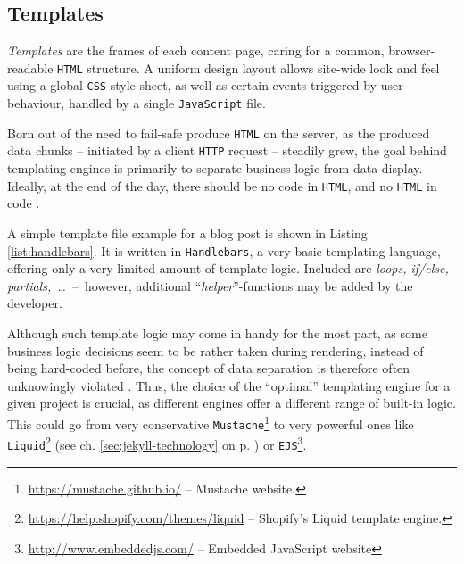 \subsection{Templates}
\label{sec:buildpipelines-templates}

\emph{Templates} are the frames of each content page, caring for a common, browser-readable \texttt{HTML} structure. A uniform design layout allows site-wide look and feel using a global \texttt{CSS} style sheet, as well as certain events triggered by user behaviour, handled by a single \texttt{JavaScript} file.

Born out of the need to fail-safe produce \texttt{HTML} on the server, as the produced data chunks -- initiated by a client \texttt{HTTP} request -- steadily grew, the goal behind templating engines is primarily to separate business logic from data display. Ideally, at the end of the day, there should be no code in \texttt{HTML}, and no \texttt{HTML} in code \cite[225]{Parr2004templates}.



A simple template file example for a blog post is shown in Listing \ref{list:handlebars}. It is written in \texttt{Handlebars}, a very basic templating language, offering only a very limited amount of template logic. Included are \emph{loops, if/else, partials,~\ldots}~--~however, additional ``\emph{helper}''-functions may be added by the developer.

Although such template logic may come in handy for the most part, as some business logic decisions seem to be rather taken during rendering, instead of being hard-coded before, the concept of data separation is therefore often unknowingly violated \cite[228]{Parr2004templates}. Thus, the choice of the ``optimal'' templating engine for a given project is crucial, as different engines offer a different range of built-in logic. This could go from very conservative \texttt{Mustache}\footnote{\url{https://mustache.github.io/} -- Mustache website.} to very powerful ones like \texttt{Liquid}\footnote{\url{https://help.shopify.com/themes/liquid} -- Shopify's Liquid template engine.} (see ch. \ref{sec:jekyll-technology} on p. \pageref{sec:jekyll-technology}) or \texttt{EJS}\footnote{\url{http://www.embeddedjs.com/} -- Embedded JavaScript website}.
